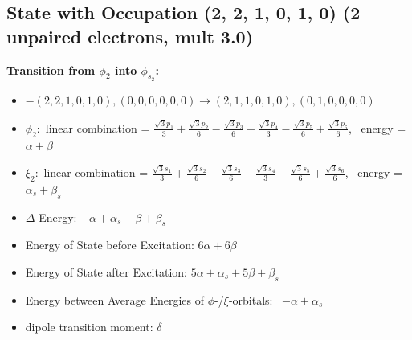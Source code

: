 \documentclass[12pt,a4paper]{article}
\begin{document}
\subsection*{State with Occupation (2, 2, 1, 0, 1, 0) (2 unpaired electrons, mult 3.0)}
        \noindent\textbf{Transition from $\phi_{2}$ into $\phi_{s_{2}}$:}
        \begin{itemize}
            \item $- (2, 2, 1, 0, 1, 0), (0, 0, 0, 0, 0, 0) \rightarrow (2, 1, 1, 0, 1, 0), (0, 1, 0, 0, 0, 0)$
        
            \item $\phi_{2}:$ linear combination = $\frac{\sqrt{3} p_{1}}{3} + \frac{\sqrt{3} p_{2}}{6} - \frac{\sqrt{3} p_{3}}{6} - \frac{\sqrt{3} p_{4}}{3} - \frac{\sqrt{3} p_{5}}{6} + \frac{\sqrt{3} p_{6}}{6}$, \
            energy = $\alpha + \beta$
            
            \item $\xi_{2}:$ linear combination = $\frac{\sqrt{3} s_{1}}{3} + \frac{\sqrt{3} s_{2}}{6} - \frac{\sqrt{3} s_{3}}{6} - \frac{\sqrt{3} s_{4}}{3} - \frac{\sqrt{3} s_{5}}{6} + \frac{\sqrt{3} s_{6}}{6}$, \
            energy = $\alpha_{s} + \beta_{s}$
            
            \item $\Delta$ Energy: $- \alpha + \alpha_{s} - \beta + \beta_{s}$
            \item Energy of State before Excitation: $6 \alpha + 6 \beta$
            \item Energy of State after Excitation: $5 \alpha + \alpha_{s} + 5 \beta + \beta_{s}$
            \item Energy between Average Energies of $\phi$-/$\xi$-orbitals: \
            $- \alpha + \alpha_{s}$
        
            \item dipole transition moment: $\delta$
        
        \end{itemize}
        
\end{document}
